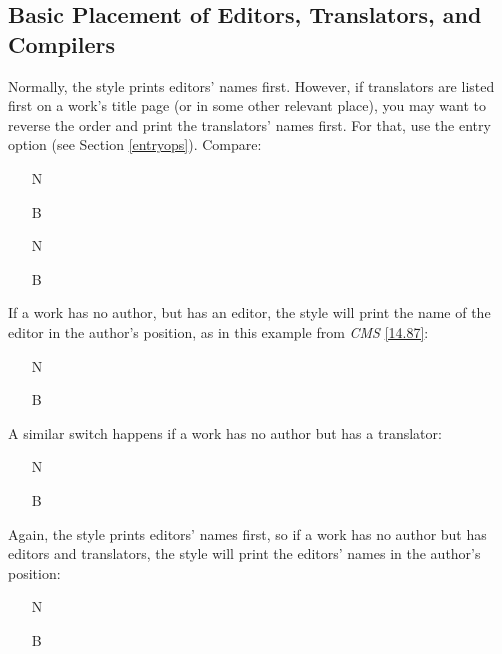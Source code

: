 \documentclass[11pt,letterpaper,oneside]{article}
\begin{document}
\subsection{Basic Placement of Editors, Translators, and Compilers}
\label{edtranspos}

Normally, the style prints editors' names first. However, if
translators are listed first on a work's title page (or in some other
relevant place), you may want to reverse the order and print the
translators' names first. For that, use the entry option
 (see Section \ref{entryops}). Compare:

\begin{itemize}
\item[N] 

\item[B] 

\item[N] 

\item[B] 
\end{itemize}

If a work has no author, but has an editor, the style will print the
name of the editor in the author's position, as in this example from
\textit{CMS} \ref{14.87}:

\begin{itemize}
\item[N] 

\item[B] 
\end{itemize}

\noindent A similar switch happens if a work has no author but has a
translator:

\begin{itemize}
\item[N] 

\item[B] 
\end{itemize}

Again, the style prints editors' names first, so if a work has no
author but has editors and translators, the style will print the
editors' names in the author's position:

\begin{itemize}
\item[N] 

\item[B] 
\end{itemize}
\end{document}
